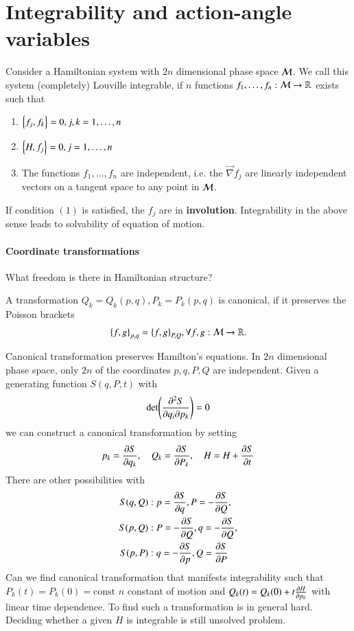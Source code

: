 \section{Integrability and action-angle variables}
\begin{definition}
	Consider a Hamiltonian system with $2n$ dimensional phase space $\mathcal{M}$. We call this system (completely) Louville integrable, if $n$ functions $f_1, \dots, f_n: \mathcal{M} \rightarrow \mathbb{R}$ exists such that
	\begin{enumerate}
		\item $\pb{f_j}{f_k} = 0, j, k = 1, \dots, n$
		\item $\pb{H}{f_j} = 0, j=1, \dots, n$
		\item The functions $f_1, \dots, f_n$ are independent, i.e. the $\vec{\nabla} f_j$ are linearly independent vectors on a tangent space to any point in $\mathcal{M}$.
	\end{enumerate}
\end{definition}
If condition $(1)$ is satisfied, the $f_j$ are in \textbf{involution}. Integrability in the above sense leads to solvability of equation of motion.

\paragraph{Coordinate transformations}
What freedom is there in Hamiltonian structure?

\begin{definition}
	A transformation $Q_k = Q_k(p, q), P_k = P_k(p, q)$ is canonical, if it preserves the Poisson brackets
	\begin{equation*}
		\pb{f}{g}_{p, q} = \pb{f}{g}_{P, Q}, \forall f,g: \M \rightarrow \R.
	\end{equation*}
\end{definition}
Canonical transformation preserves Hamilton's equations. In $2n$ dimensional phase space, only $2n$ of the coordinates $p, q, P, Q$ are independent. Given a generating function $S(q, P, t)$ with
\begin{equation*}
	\det(\pdv[2]{S}{q_i}{p_k}) = 0	
\end{equation*}
we can construct a canonical transformation by setting 
\begin{equation}
	p_k = \pdv{S}{q_k}, \quad Q_k = \pdv{S}{P_k}, \quad H = H+ \pdv{S}{t}
\end{equation}
There are other possibilities with
\begin{align*}
	S(q, Q):& \; p = \pdv{S}{q} , P=-\pdv{S}{Q} , \\
	S(p, Q):& \; P = -\pdv{S}{Q}, q = - \pdv{S}{Q}, \\
	S(p, P):& \; q = - \pdv{S}{p}, Q= \pdv{S}{P}
	\label{eq:}
\end{align*}
Can we find canonical transformation that manifests integrability such that $P_k(t) = P_k(0) =\text{const}$ $n$ constant of motion and $Q_k(t) = Q_k(0) + t \pdv{H}{p_k}$ with linear time dependence. To find such a transformation is in general hard. Deciding whether a given $H$ is integrable is still unsolved problem.

